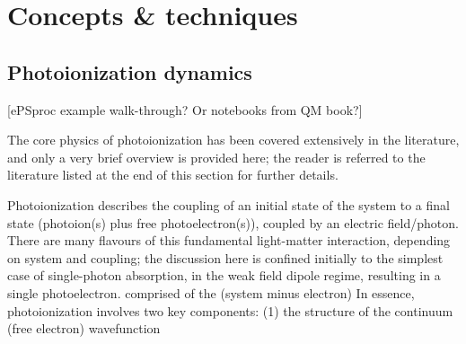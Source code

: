 \section{Concepts \& techniques}

\subsection{Photoionization dynamics} 
[ePSproc example walk-through? Or notebooks from QM book?]

The core physics of photoionization has been covered extensively in the literature, and only a very brief overview is provided here; the reader is referred to the literature listed at the end of this section for further details.

Photoionization describes the coupling of an initial state of the system to a final state (photoion(s) plus free photoelectron(s)), coupled by an electric field/photon. There are many flavours of this fundamental light-matter interaction, depending on system and coupling; the discussion here is confined initially to the simplest case of single-photon absorption, in the weak field dipole regime, resulting in a single photoelectron.
comprised of the (system minus electron)  In essence, photoionization involves two key components: (1) the structure of the continuum (free electron) wavefunction 